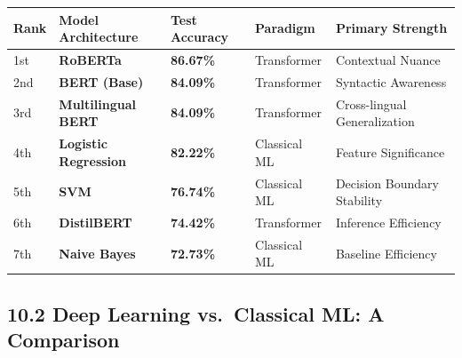 \documentclass[
]{article}
\begin{document}
\begin{longtable}[]{@{}
  >{\centering\arraybackslash}p{}
  >{\raggedright\arraybackslash}p{}
  >{\centering\arraybackslash}p{}
  >{\centering\arraybackslash}p{}
  >{\raggedright\arraybackslash}p{}@{}}
\toprule\noalign{}
\begin{minipage}[b]{\linewidth}\centering
Rank
\end{minipage} & \begin{minipage}[b]{\linewidth}\raggedright
Model Architecture
\end{minipage} & \begin{minipage}[b]{\linewidth}\centering
Test Accuracy
\end{minipage} & \begin{minipage}[b]{\linewidth}\centering
Paradigm
\end{minipage} & \begin{minipage}[b]{\linewidth}\raggedright
Primary Strength
\end{minipage} \\
\midrule\noalign{}
\endhead
\bottomrule\noalign{}
\endlastfoot
1st & \textbf{RoBERTa} & \textbf{86.67\%} & Transformer & Contextual
Nuance \\
2nd & \textbf{BERT (Base)} & \textbf{84.09\%} & Transformer & Syntactic
Awareness \\
3rd & \textbf{Multilingual BERT} & \textbf{84.09\%} & Transformer &
Cross-lingual Generalization \\
4th & \textbf{Logistic Regression} & \textbf{82.22\%} & Classical ML &
Feature Significance \\
5th & \textbf{SVM} & \textbf{76.74\%} & Classical ML & Decision Boundary
Stability \\
6th & \textbf{DistilBERT} & \textbf{74.42\%} & Transformer & Inference
Efficiency \\
7th & \textbf{Naive Bayes} & \textbf{72.73\%} & Classical ML & Baseline
Efficiency \\
\end{longtable}

\subsection{10.2 Deep Learning vs.~Classical ML: A
Comparison}\label{deep-learning-vs.-classical-ml-a-comparison}
\end{document}
